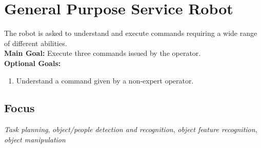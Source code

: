 \section{General Purpose Service Robot}\label{test:gpsr}

The robot is asked to understand and execute commands requiring a wide range of different abilities. \\

\noindent \textbf{Main Goal:} Execute three commands issued by the operator.\\

\noindent \textbf{Optional Goals:}
\begin{enumerate}[nosep]
	\item Understand a command given by a non-expert operator.
\end{enumerate}

\subsection*{Focus}
\emph{Task planning}, \emph{object/people detection and recognition}, \emph{object feature recognition}, \emph{object manipulation}

